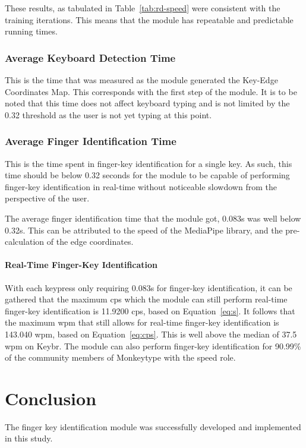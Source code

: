 \documentclass{report}
\begin{document}
These results, as tabulated in Table~\ref{tab:rd-speed} were consistent with the
training iterations. This means that the module has repeatable and predictable
running times.

\subsection{Average Keyboard Detection Time}
This is the time that was measured as the module generated the Key-Edge
Coordinates Map. This corresponds with the first step of the module. It is to be
noted that this time does not affect keyboard typing and is not limited by the
0.32 threshold as the user is not yet typing at this point.

\subsection{Average Finger Identification Time}
This is the time spent in finger-key identification for a single key. As such,
this time should be below 0.32 seconds for the module to be capable of
performing finger-key identification in real-time without noticeable slowdown
from the perspective of the user.

The average finger identification time that the module got, 0.083s was
well below 0.32s. This can be attributed to the speed of the MediaPipe
library, and the pre-calculation of the edge coordinates.

\subsubsection{Real-Time Finger-Key Identification}
With each keypress only requiring 0.083s for finger-key identification, it can
be gathered that the maximum \ac{cps} which the module can still perform
real-time finger-key identification is 11.9200 \ac{cps}, based on
Equation~\ref{eq:s}. It follows that the maximum \ac{wpm} that still allows for
real-time finger-key identification is 143.040 \ac{wpm}, based on
Equation~\ref{eq:cps}. This is well above the median of 37.5 \ac{wpm} on Keybr.
The module can also perform finger-key identification for 90.99\% of the
community members of Monkeytype with the speed role.

\chapter{Conclusion}

The finger key identification module was successfully developed and implemented
in this study.
\end{document}
